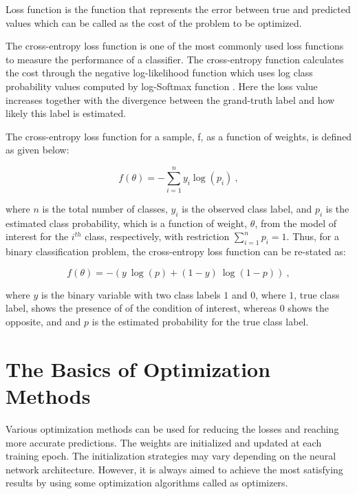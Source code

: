Loss function is the function that represents the error between true and predicted values which can be called as the cost of the problem to be optimized.

The cross-entropy loss function is one of the most commonly used loss functions to measure the performance of a classifier. The cross-entropy function calculates the cost through the negative log-likelihood function \cite{negative-ll} which uses log class probability values computed by log-Softmax function \cite{logsoftmax}. Here the loss value increases together with the divergence between the grand-truth label and how likely this label is estimated.

The cross-entropy loss function for a sample, f, as a function of weights, is defined as given below:

\begin{equation}
\label{eq:cross_entropy_loss_formulae}
    f(\theta) = - \sum_{i=1}^{n} y_{i} \log(p_{i}) \:,
\end{equation}

where $n$ is the total number of classes, $y_{i}$ is the observed class label, and $p_{i}$ is the estimated class probability, which is a function of weight, $\theta$, from the model of interest for the $i^{th}$ class, respectively, with restriction $\sum_{i=1}^{n}p_{i}=1$. Thus, for a binary classification problem, the cross-entropy loss function can be re-stated as:

\begin{equation}
\label{eq:binary_cross_entropy_loss_formulae}
    f(\theta) = - \left ( y\:\log(p) + (1 - y)\:\log(1-p) \right ) \:,
\end{equation}

where $y$ is the binary variable with two class labels $1$ and $0$, where $1$, true class label, shows the presence of of the condition of interest, whereas $0$ shows the opposite, and and $p$ is the estimated probability for the true class label.

\section{The Basics of Optimization Methods}
\label{sec:CH3_the_basics_of_optimization}

Various optimization methods can be used for reducing the losses and reaching more accurate predictions. The weights are initialized and updated at each training epoch. The initialization strategies may vary depending on the neural network architecture. However, it is always aimed to achieve the most satisfying results by using some optimization algorithms called as optimizers.

